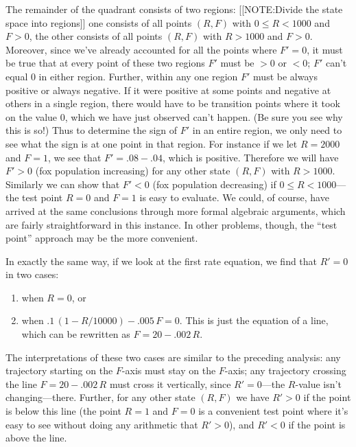 The remainder of the quadrant consists of two regions: 
[[NOTE:Divide the state space into regions]]
one consists of all points $(R, F)$ with $0\leq R<1000$ and $F>0$, the
other consists of all points $(R, F)$ with $R>1000$ and $F>0$.
Moreover, since we've already accounted for all the points where
$F'=0$, it must be true that at every point of these two regions $F' $
must be $>0$ or $<0$; $F'$ can't equal 0 in either region.  Further,
within any one region $F'$ must be always positive or always negative.
If it were positive at some points and negative at others in a single
region, there would have to be transition points where it took on the
value 0, which we have just observed can't happen.  (Be sure you see
why this is so!)  Thus to determine the sign of $F'$ in an entire
region, we only need to see what the sign is at one point in that
region.  For instance if we let $R=2000$ and $F=1$, we see that $F'=
.08-.04$, which is positive.  Therefore we will have $F'>0$ (fox
population increasing) for any other state $(R, F)$ with $R>1000$.
Similarly we can show that $F'<0$ (fox population decreasing) if
$0\leq R<1000$---the test point $R=0$ and $F=1$ is easy to evaluate.
We could, of course, have arrived at the same conclusions through more
formal algebraic arguments, which are fairly straightforward in this
instance.  In other problems, though, the ``test point'' approach may
be the more convenient.

In exactly the same way, if we look at the first rate equation, we
find that $R'=0$ in two cases:
\begin{enumerate}

\item  when $R=0$, or

\item when $.1\,(1-R/10000)-.005\,F=0$.  This is just the equation of
  a line, which can be rewritten as $F=20-.002\,R$.

\end{enumerate}

The interpretations of these two cases are similar to the preceding
analysis: any trajectory starting on the $F$-axis must stay on the
$F$-axis; any trajectory crossing the line $F=20-.002\,R$ must cross
it vertically, since $R'=0$---the $R$-value isn't
changing---there. Further, for any other state $(R, F)$ we have $R'>0$
if the point is below this line (the point $R=1$ and $F=0$ is a
convenient test point where it's easy to see without doing any
arithmetic that $R'>0$), and $R'<0$ if the point is above the line.

